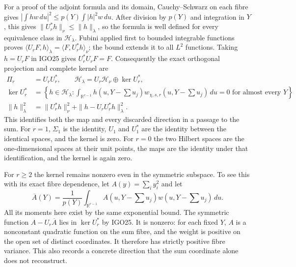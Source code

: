 For a proof of the adjoint formula and its domain, Cauchy--Schwarz
on each fibre gives
$|\int hw\,du|^2\leq p(Y)\int|h|^2w\,du$.
After division by $p(Y)$ and integration in $Y$, this gives
$\|U_r^*h\|_{\nu}\leq\|h\|_{\lambda}$, so the formula is
well defined for every equivalence class in $\mathcal H_\lambda$.
Fubini applied first to bounded integrable functions proves
$\langle U_rF,h\rangle_\lambda=\langle F,U_r^*h\rangle_\nu$;
the bound extends it to all $L^2$ functions. Taking $h=U_rF$
in IGO25 gives $U_r^*U_rF=F$. Consequently the exact orthogonal
projection and complete kernel are
\[
 \begin{split}
 \Pi_r&=U_rU_r^*,\qquad
 \mathcal H_\lambda=U_r\mathcal H_\nu\mathbin{\oplus}\ker U_r^*,\\
 \ker U_r^*&=\left\{h\in\mathcal H_\lambda:
    \int_{\mathbb R^{r-1}}h(u,Y-\textstyle\sum u_j)
     w_{\chi,s,r}(u,Y-\textstyle\sum u_j)\,du=0
      \text{ for almost every }Y\right\},\\
 \|h\|_\lambda^2&=\|U_r^*h\|_\nu^2+
                   \|h-U_rU_r^*h\|_\lambda^2.
 \end{split}
 \tag{IGO26}
\]
This identifies both the map and every discarded direction
in a passage to the sum. For $r=1$, $\Sigma_1$ is the identity,
$U_1$ and $U_1^*$ are the identity between the identical spaces,
and the kernel is zero. For $r=0$ the two Hilbert spaces are
the one-dimensional spaces at their unit points, the maps
are the identity under that identification, and the kernel
is again zero.

For $r\geq2$ the kernel remains nonzero even in the symmetric
subspace. To see this with its exact fibre dependence, let
$A(y)=\sum_i y_i^2$ and let
\[
 \overline A(Y)=\frac{1}{p(Y)}
     \int_{\mathbb R^{r-1}}A(u,Y-\textstyle\sum u_j)
                 w(u,Y-\textstyle\sum u_j)\,du.
\]
All its moments here exist by the same exponential bound.
The symmetric function $A-U_r\overline A$ lies in
$\ker U_r^*$ by IGO25. It is nonzero: for each fixed $Y$,
$A$ is a nonconstant quadratic function on the sum fibre,
and the weight is positive on the open set of distinct
coordinates. It therefore has strictly positive fibre
variance. This also records a concrete direction that the
sum coordinate alone does not reconstruct.

